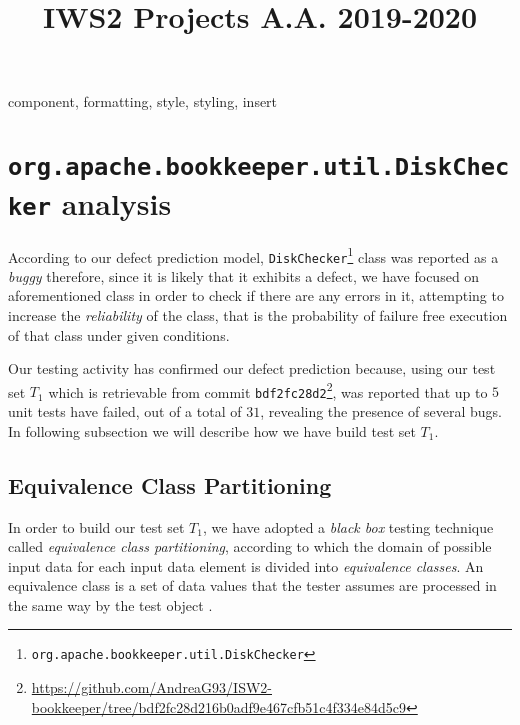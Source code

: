 \documentclass[conference]{IEEEtran}
\begin{document}
\title{IWS2 Projects A.A. 2019-2020}

\author{
}

\maketitle

\begin{IEEEkeywords}
component, formatting, style, styling, insert
\end{IEEEkeywords}




\section{\texttt{org.apache.bookkeeper.util.DiskChecker} analysis}

According to our defect prediction model, \texttt{DiskChecker}\footnote{\texttt{org.apache.bookkeeper.util.DiskChecker}} class was reported as a \textit{buggy} therefore, since it is likely that it exhibits a defect, we have focused on aforementioned class in order to check if there are any errors in it, attempting to increase the \textit{reliability} of the class, that is the probability of failure free execution of that class under given conditions.

Our testing activity has confirmed our defect prediction because, using our test set $T_1$ which is retrievable from commit \texttt{bdf2fc28d2}\footnote{\url{https://github.com/AndreaG93/ISW2-bookkeeper/tree/bdf2fc28d216b0adf9e467cfb51c4f334e84d5c9}}, was reported that up to $5$ unit tests have failed, out of a total of $31$, revealing the presence of several bugs. In following subsection we will describe how we have build test set $T_1$.

\subsection{Equivalence Class Partitioning}

In order to build our test set $T_1$, we have adopted a \textit{black box} testing technique called \textit{equivalence class partitioning}, according to which the domain of possible input data for each input data element is divided
into \textit{equivalence classes}. An equivalence class is a set of data values that the tester assumes are processed in the same way by the test object \cite{FoundationSoftwareTesting}.
\end{document}

